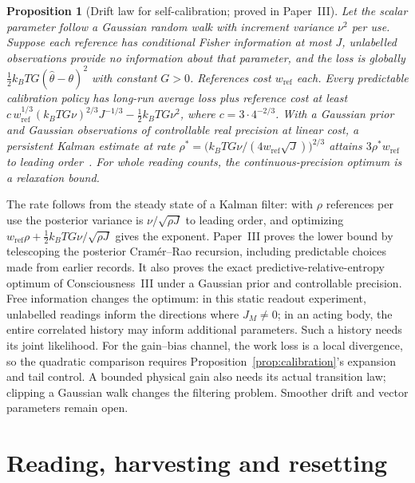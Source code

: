 \documentclass[12pt]{article}
\newtheorem{proposition}[theorem]{Proposition}
\begin{document}
\begin{proposition}[Drift law for self-calibration; proved in Paper~III]
\label{conj:drift}
Let the scalar parameter follow a Gaussian random walk with increment variance $\nu^2$ per use. Suppose each reference has conditional Fisher information at most $J$, unlabelled observations provide no information about that parameter, and the loss is globally $\tfrac12k_BTG(\hat\theta-\theta)^2$ with constant $G>0$. References cost $w_{\mathrm{ref}}$ each. Every predictable calibration policy has long-run average loss plus reference cost at least $c\,w_{\mathrm{ref}}^{1/3}(k_BTG\nu)^{2/3}J^{-1/3}-\tfrac12k_BTG\nu^2$, where $c=3\cdot4^{-2/3}$. With a Gaussian prior and Gaussian observations of controllable real precision at linear cost, a persistent Kalman estimate at rate $\rho^*=\bigl(k_BTG\nu/(4w_{\mathrm{ref}}\sqrt J)\bigr)^{2/3}$ attains $3\rho^*w_{\mathrm{ref}}$ to leading order~\cite{Liu2026TDOME_III}. For whole reading counts, the continuous-precision optimum is a relaxation bound.
\end{proposition}

The rate follows from the steady state of a Kalman filter: with $\rho$ references per use the posterior variance is $\nu/\sqrt{\rho J}$ to leading order, and optimizing $w_{\mathrm{ref}}\rho+\tfrac12k_BTG\nu/\sqrt{\rho J}$ gives the exponent. Paper~III proves the lower bound by telescoping the posterior Cram\'er--Rao recursion, including predictable choices made from earlier records. It also proves the exact predictive-relative-entropy optimum of Consciousness~III under a Gaussian prior and controllable precision. Free information changes the optimum: in this static readout experiment, unlabelled readings inform the directions where $J_M\neq0$; in an acting body, the entire correlated history may inform additional parameters. Such a history needs its joint likelihood. For the gain--bias channel, the work loss is a local divergence, so the quadratic comparison requires Proposition~\ref{prop:calibration}'s expansion and tail control. A bounded physical gain also needs its actual transition law; clipping a Gaussian walk changes the filtering problem. Smoother drift and vector parameters remain open.

\section{Reading, harvesting and resetting}
\label{sec:cycle}
\end{document}
